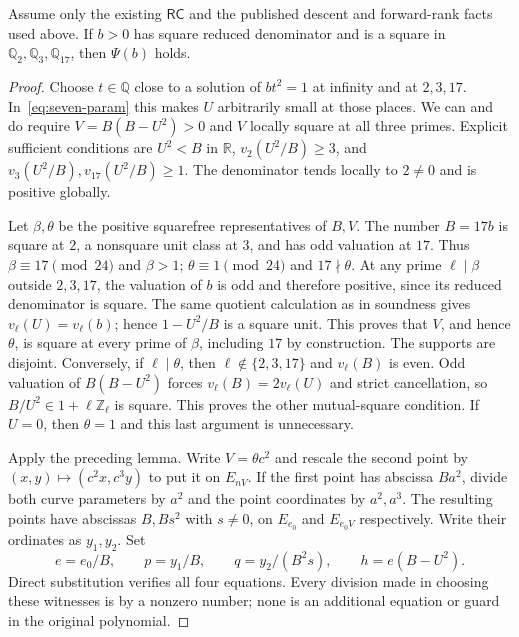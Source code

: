 \begin{lemma}
\label{lem:original-seven-parity-completeness}
Assume only the existing $\mathsf{RC}$ and the published descent and
forward-rank facts used above. If $b>0$ has square reduced denominator
and is a square in $\mathbb Q_2,\mathbb Q_3,\mathbb Q_{17}$, then
$\Psi(b)$ holds.
\end{lemma}
\begin{proof}
Choose $t\in\mathbb Q$ close to a solution of $bt^2=1$ at infinity
and at $2,3,17$. In~\eqref{eq:seven-param} this makes $U$ arbitrarily
small at those places. We can and do require
$V=B(B-U^2)>0$ and $V$ locally square at all three primes.
Explicit sufficient conditions are $U^2<B$ in $\mathbb R$,
$v_2(U^2/B)\ge3$, and $v_3(U^2/B),v_{17}(U^2/B)\ge1$.
The denominator tends locally to $2\ne0$ and is positive globally.

Let $\beta,\theta$ be the positive squarefree representatives of
$B,V$. The number $B=17b$ is square at $2$, a nonsquare unit class
at $3$, and has odd valuation at $17$. Thus
$\beta\equiv17\pmod{24}$ and $\beta>1$;
$\theta\equiv1\pmod{24}$ and $17\nmid\theta$.
At any prime $\ell\mid\beta$ outside $2,3,17$, the valuation of
$b$ is odd and therefore positive, since its reduced denominator is
square. The same quotient calculation as in soundness gives
$v_\ell(U)=v_\ell(b)$; hence $1-U^2/B$ is a square unit.
This proves that $V$, and hence $\theta$, is square at every prime
of $\beta$, including $17$ by construction. The supports are disjoint.
Conversely, if $\ell\mid\theta$, then $\ell\notin\{2,3,17\}$
and $v_\ell(B)$ is even. Odd valuation of $B(B-U^2)$ forces
$v_\ell(B)=2v_\ell(U)$ and strict cancellation, so
$B/U^2\in1+\ell\mathbb Z_\ell$ is square. This proves the other
mutual-square condition. If $U=0$, then $\theta=1$ and this last
argument is unnecessary.

Apply the preceding lemma. Write $V=\theta c^2$ and rescale the
second point by $(x,y)\mapsto(c^2x,c^3y)$ to put it on $E_{nV}$.
If the first point has abscissa $Ba^2$, divide both curve parameters
by $a^2$ and the point coordinates by $a^2,a^3$. The resulting
points have abscissas $B,Bs^2$ with $s\ne0$, on $E_{e_0}$ and
$E_{e_0V}$ respectively. Write their ordinates as $y_1,y_2$.
Set
\[
 e=e_0/B,\qquad p=y_1/B,\qquad
 q=y_2/(B^2s),\qquad h=e(B-U^2).
\]
Direct substitution verifies all four equations. Every division
made in choosing these witnesses is by a nonzero number; none is
an additional equation or guard in the original polynomial.
\end{proof}

